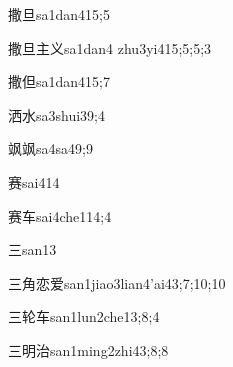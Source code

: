 
\begin{verbete}{撒旦}{sa1dan4}{15;5}
\end{verbete}

\begin{verbete}{撒旦主义}{sa1dan4 zhu3yi4}{15;5;5;3}
\end{verbete}

\begin{verbete}{撒但}{sa1dan4}{15;7}
\end{verbete}

\begin{verbete}{洒水}{sa3shui3}{9;4}
\end{verbete}

\begin{verbete}{飒飒}{sa4sa4}{9;9}
\end{verbete}

\begin{verbete}{赛}{sai4}{14}
\end{verbete}

\begin{verbete}{赛车}{sai4che1}{14;4}
\end{verbete}

\begin{verbete}{三}{san1}{3}
\end{verbete}

\begin{verbete}{三角恋爱}{san1jiao3lian4'ai4}{3;7;10;10}
\end{verbete}

\begin{verbete}{三轮车}{san1lun2che1}{3;8;4}
\end{verbete}

\begin{verbete}{三明治}{san1ming2zhi4}{3;8;8}
\end{verbete}

